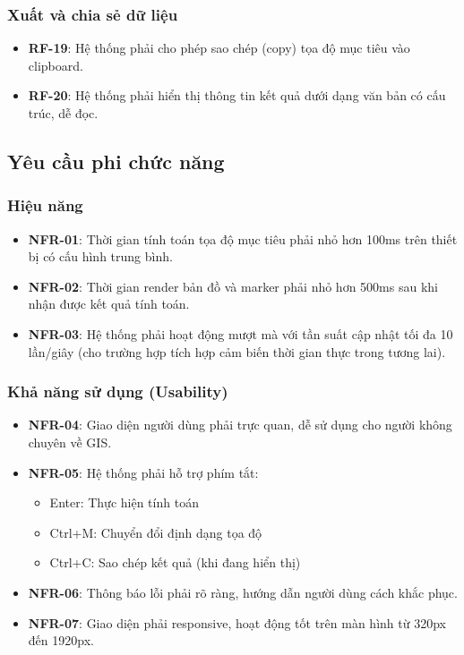 \subsubsection{Xuất và chia sẻ dữ liệu}
\begin{itemize}
    \item \textbf{RF-19}: Hệ thống phải cho phép sao chép (copy) tọa độ mục tiêu vào clipboard.
    \item \textbf{RF-20}: Hệ thống phải hiển thị thông tin kết quả dưới dạng văn bản có cấu trúc, dễ đọc.
\end{itemize}

\subsection{Yêu cầu phi chức năng}

\subsubsection{Hiệu năng}
\begin{itemize}
    \item \textbf{NFR-01}: Thời gian tính toán tọa độ mục tiêu phải nhỏ hơn 100ms trên thiết bị có cấu hình trung bình.
    \item \textbf{NFR-02}: Thời gian render bản đồ và marker phải nhỏ hơn 500ms sau khi nhận được kết quả tính toán.
    \item \textbf{NFR-03}: Hệ thống phải hoạt động mượt mà với tần suất cập nhật tối đa 10 lần/giây (cho trường hợp tích hợp cảm biến thời gian thực trong tương lai).
\end{itemize}

\subsubsection{Khả năng sử dụng (Usability)}
\begin{itemize}
    \item \textbf{NFR-04}: Giao diện người dùng phải trực quan, dễ sử dụng cho người không chuyên về GIS.
    \item \textbf{NFR-05}: Hệ thống phải hỗ trợ phím tắt:
    \begin{itemize}
        \item Enter: Thực hiện tính toán
        \item Ctrl+M: Chuyển đổi định dạng tọa độ
        \item Ctrl+C: Sao chép kết quả (khi đang hiển thị)
    \end{itemize}
    \item \textbf{NFR-06}: Thông báo lỗi phải rõ ràng, hướng dẫn người dùng cách khắc phục.
    \item \textbf{NFR-07}: Giao diện phải responsive, hoạt động tốt trên màn hình từ 320px đến 1920px.
\end{itemize}

